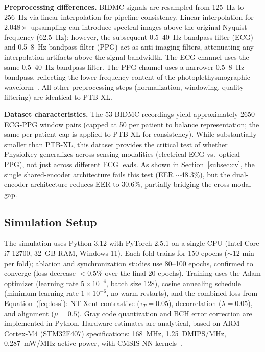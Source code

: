 \documentclass[sensors,article,submit,pdftex,moreauthors]{Definitions/mdpi}
\begin{document}
\textbf{Preprocessing differences.} BIDMC signals are resampled from 125~Hz to 256~Hz via linear interpolation for pipeline consistency. Linear interpolation for $2.048\times$ upsampling can introduce spectral images above the original Nyquist frequency (62.5~Hz); however, the subsequent 0.5--40~Hz bandpass filter (ECG) and 0.5--8~Hz bandpass filter (PPG) act as anti-imaging filters, attenuating any interpolation artifacts above the signal bandwidth. The ECG channel uses the same 0.5--40~Hz bandpass filter. The PPG channel uses a narrower 0.5--8~Hz bandpass, reflecting the lower-frequency content of the photoplethysmographic waveform~\cite{clifford2006advanced}. All other preprocessing steps (normalization, windowing, quality filtering) are identical to PTB-XL.

\textbf{Dataset characteristics.} The 53 BIDMC recordings yield approximately 2650 ECG-PPG window pairs (capped at 50 per patient to balance representation; the same per-patient cap is applied to PTB-XL for consistency). While substantially smaller than PTB-XL, this dataset provides the critical test of whether PhysioKey generalizes across sensing modalities (electrical ECG vs.\ optical PPG), not just across different ECG leads. As shown in Section~\ref{subsec:cv}, the single shared-encoder architecture fails this test (EER $\sim$48.3\%), but the dual-encoder architecture reduces EER to 30.6\%, partially bridging the cross-modal gap.

\subsection{Simulation Setup}
\label{subsec:sim_setup}

The simulation uses Python 3.12 with PyTorch 2.5.1 on a single CPU (Intel Core i7-12700, 32~GB RAM, Windows 11). Each fold trains for 150 epochs ($\sim$12 min per fold); ablation and synchronization studies use 80--100 epochs, confirmed to converge (loss decrease $<$0.5\% over the final 20 epochs). Training uses the Adam optimizer (learning rate $5 \times 10^{-4}$, batch size 128), cosine annealing schedule (minimum learning rate $1 \times 10^{-6}$, no warm restarts), and the combined loss from Equation~(\ref{eq:loss}): NT-Xent contrastive ($\tau_T = 0.05$), decorrelation ($\lambda = 0.05$), and alignment ($\mu = 0.5$). Gray code quantization and BCH error correction are implemented in Python. Hardware estimates are analytical, based on ARM Cortex-M4 (STM32F407) specifications: 168~MHz, 1.25~DMIPS/MHz, 0.287~mW/MHz active power, with CMSIS-NN kernels~\cite{lai2018cmsis}.
\end{document}
